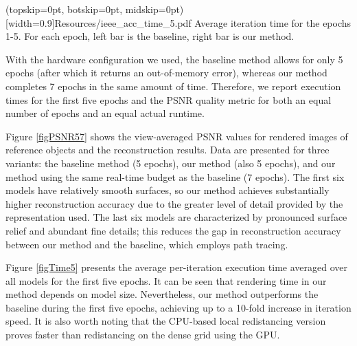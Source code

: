 \documentclass{ieeeaccess}
\begin{document}
\Figure[h](topskip=0pt, botskip=0pt, midskip=0pt)[width=0.9\linewidth]{Resources/ieee_acc_time_5.pdf} {
    Average iteration time for the epochs 1-5. For each epoch, left bar is the baseline, right bar is our method.
    \label{figTime5}
}

With the hardware configuration we used, the baseline method allows for only 5 epochs (after which it returns an out-of-memory error), whereas our method completes 7 epochs in the same amount of time. Therefore, we report execution times for the first five epochs and the PSNR quality metric for both an equal number of epochs and an equal actual runtime.

Figure \ref{figPSNR57} shows the view-averaged PSNR values for rendered images of reference objects and the reconstruction results. Data are presented for three variants: the baseline method (5 epochs), our method (also 5 epochs), and our method using the same real-time budget as the baseline (7 epochs). The first six models have relatively smooth surfaces, so our method achieves substantially higher reconstruction accuracy due to the greater level of detail provided by the representation used. The last six models are characterized by pronounced surface relief and abundant fine details; this reduces the gap in reconstruction accuracy between our method and the baseline, which employs path tracing.

Figure \ref{figTime5} presents the average per-iteration execution time averaged over all models for the first five epochs. It can be seen that rendering time in our method depends on model size. Nevertheless, our method outperforms the baseline during the first five epochs, achieving up to a 10-fold increase in iteration speed. It is also worth noting that the CPU-based local redistancing version proves faster than redistancing on the dense grid using the GPU.
\end{document}
